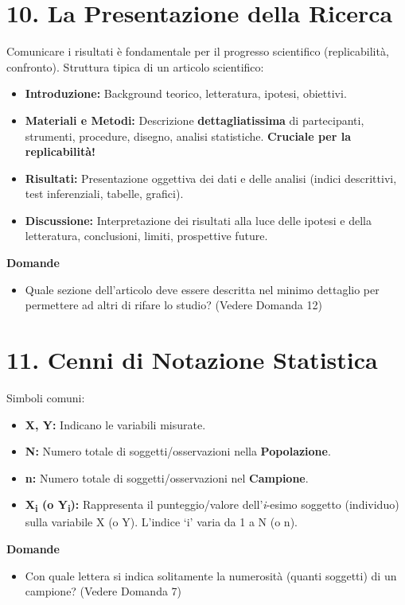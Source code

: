 \documentclass[12pt, a4paper]{article}
\newenvironment{reflectionbox}{%
    \medskip %
    \begin{framed}\par\noindent
    \textbf{\color{boxtitlecolor}Domande} \par
    \begin{itemize}[leftmargin=*, label=$\blacktriangleright$]
}{%
    \end{itemize}\par
    \end{framed}
    \medskip %
}
\begin{document}
\section*{10. La Presentazione della Ricerca}
Comunicare i risultati è fondamentale per il progresso scientifico (replicabilità, confronto). Struttura tipica di un articolo scientifico:
\begin{itemize}
    \item \textbf{Introduzione:} Background teorico, letteratura, ipotesi, obiettivi.
    \item \textbf{Materiali e Metodi:} Descrizione \textbf{dettagliatissima} di partecipanti, strumenti, procedure, disegno, analisi statistiche. \textbf{Cruciale per la replicabilità!}
    \item \textbf{Risultati:} Presentazione oggettiva dei dati e delle analisi (indici descrittivi, test inferenziali, tabelle, grafici).
    \item \textbf{Discussione:} Interpretazione dei risultati alla luce delle ipotesi e della letteratura, conclusioni, limiti, prospettive future.
\end{itemize}

\begin{reflectionbox}
    \item Quale sezione dell'articolo deve essere descritta nel minimo dettaglio per permettere ad altri di rifare lo studio? (Vedere Domanda 12)
\end{reflectionbox}

\section*{11. Cenni di Notazione Statistica}
Simboli comuni:
\begin{itemize}
    \item \textbf{X, Y:} Indicano le variabili misurate.
    \item \textbf{N:} Numero totale di soggetti/osservazioni nella \textbf{Popolazione}.
    \item \textbf{n:} Numero totale di soggetti/osservazioni nel \textbf{Campione}.
    \item \textbf{X\textsubscript{i} (o Y\textsubscript{i}):} Rappresenta il punteggio/valore dell'\textit{i}-esimo soggetto (individuo) sulla variabile X (o Y). L'indice `i' varia da 1 a N (o n).
\end{itemize}

\begin{reflectionbox}
    \item Con quale lettera si indica solitamente la numerosità (quanti soggetti) di un campione? (Vedere Domanda 7)
\end{reflectionbox}
\end{document}
